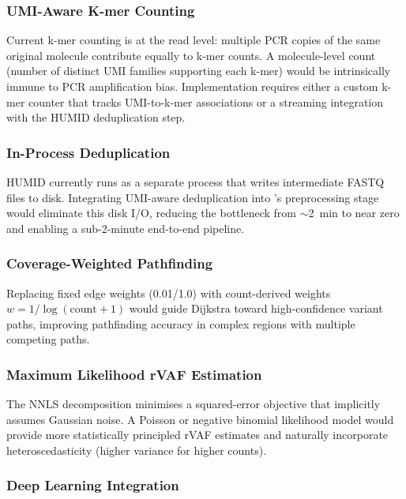 \subsubsection{UMI-Aware K-mer Counting}

Current k-mer counting is at the read level: multiple PCR copies of the same
original molecule contribute equally to k-mer counts.  A molecule-level count
(number of distinct UMI families supporting each k-mer) would be intrinsically
immune to PCR amplification bias.  Implementation requires either a custom
k-mer counter that tracks UMI-to-k-mer associations or a streaming integration
with the HUMID deduplication step.

\subsubsection{In-Process Deduplication}

HUMID currently runs as a separate process that writes intermediate FASTQ files
to disk.  Integrating UMI-aware deduplication into \kmerdet{}'s preprocessing
stage would eliminate this disk I/O, reducing the bottleneck from $\sim$2~min to
near zero and enabling a sub-2-minute end-to-end pipeline.

\subsubsection{Coverage-Weighted Pathfinding}

Replacing fixed edge weights (0.01/1.0) with count-derived weights
$w = 1/\log(\text{count} + 1)$ would guide Dijkstra toward high-confidence
variant paths, improving pathfinding accuracy in complex regions with multiple
competing paths.

\subsubsection{Maximum Likelihood rVAF Estimation}

The NNLS decomposition minimises a squared-error objective that implicitly
assumes Gaussian noise.  A Poisson or negative binomial likelihood model would
provide more statistically principled rVAF estimates and naturally incorporate
heteroscedasticity (higher variance for higher counts).

\subsubsection{Deep Learning Integration}

